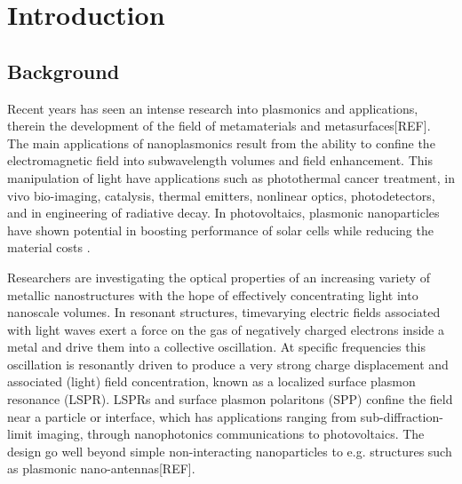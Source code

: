 
\chapter{Introduction}

\section{Background}
Recent years has seen an intense research into plasmonics and applications, therein the development of the field of metamaterials and metasurfaces[REF]. The main applications of nanoplasmonics result from the ability to confine the electromagnetic field into subwavelength volumes and field enhancement. This manipulation of light have applications such as photothermal cancer treatment, in vivo bio-imaging, catalysis, thermal emitters, nonlinear optics, photodetectors, and in engineering of radiative decay\cite{Au_nanorods_review}\cite{Schuller_plasmonicapplications_review}. In photovoltaics, plasmonic nanoparticles have shown potential in boosting performance of solar cells while reducing the material costs \cite{Trugler_metallicnanoparticles}\cite{Green_plasmonic_solarcells}.


Researchers are investigating the optical properties of an increasing variety of metallic nanostructures with the hope of effectively concentrating light into nanoscale volumes. In resonant structures, timevarying electric fields associated with light waves exert a force on the gas of negatively charged electrons inside a metal and drive them into a collective oscillation. At specific frequencies this oscillation is resonantly driven to produce a very strong charge displacement and associated (light) field concentration, known as a localized surface plasmon resonance (LSPR). LSPRs and surface plasmon polaritons (SPP) confine the field near a particle or interface, which has applications ranging from sub-diffraction-limit imaging, through nanophotonics communications to photovoltaics. The design go well beyond simple non-interacting nanoparticles to e.g. structures such as plasmonic nano-antennas[REF].

